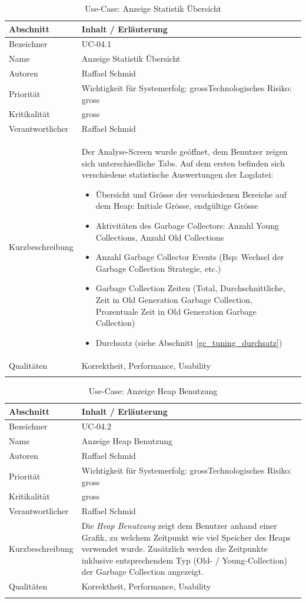\begin{longtable}{|p{4cm}|p{10.5cm}|}
\hline
   \textbf{Abschnitt} & \textbf{Inhalt / Erläuterung} \\\hline
   Bezeichner & UC-04.1\\\hline
   Name & Anzeige Statistik Übersicht\\\hline
   Autoren & Raffael Schmid\\\hline
   Priorität & Wichtigkeit für Systemerfolg: gross\newline Technologisches Risiko: gross\\\hline
   Kritikalität & gross\\\hline
   Verantwortlicher & Raffael Schmid\\\hline
   Kurzbeschreibung & Der Analyse-Screen wurde geöffnet, dem Benutzer zeigen sich unterschiedliche Tabs. Auf dem ersten befinden sich verschiedene statistische Auswertungen der Logdatei:
   \begin{itemize}
	\item Übersicht und Grösse der verschiedenen Bereiche auf dem Heap: Initiale Grösse, endgültige Grösse
	\item Aktivitäten des Garbage Collectors: Anzahl Young Collections, Anzahl Old Collections
	\item Anzahl Garbage Collector Events (Bsp: Wechsel der Garbage Collection Strategie, etc.)
	\item Garbage Collection Zeiten (Total, Durchschnittliche, Zeit in Old Generation Garbage Collection, Prozentuale Zeit in Old Generation Garbage Collection)
	\item Durchsatz (siehe Abschnitt \ref{gc_tuning_durchsatz})
   \end{itemize}
 \\\hline
   Qualitäten &  Korrektheit, Performance, Usability\\\hline
\caption{Use-Case: Anzeige Statistik Übersicht}
\end{longtable}

\begin{longtable}{|p{4cm}|p{10.5cm}|}
\hline
   \textbf{Abschnitt} & \textbf{Inhalt / Erläuterung} \\\hline
   Bezeichner & UC-04.2\\\hline
   Name & Anzeige Heap Benutzung\\\hline
   Autoren & Raffael Schmid\\\hline
   Priorität & Wichtigkeit für Systemerfolg: gross\newline Technologisches Risiko: gross\\\hline
   Kritikalität & gross\\\hline
   Verantwortlicher & Raffael Schmid\\\hline
   Kurzbeschreibung & Die \textit{Heap Benutzung} zeigt dem Benutzer anhand einer Grafik, zu welchem Zeitpunkt wie viel Speicher des Heaps verwendet wurde. Zusätzlich werden die Zeitpunkte inklusive entsprechendem Typ (Old- / Young-Collection) der Garbage Collection angezeigt.  \\\hline
   Qualitäten & Korrektheit, Performance, Usability\\\hline
\caption{Use-Case: Anzeige Heap Benutzung}
\end{longtable}

